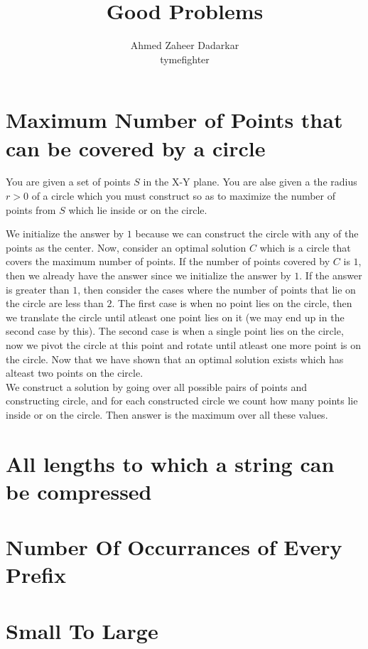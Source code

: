 \documentclass{article}
\title{Good Problems}
\author{
    Ahmed Zaheer Dadarkar\\
    tymefighter
}
\begin{document}
    \maketitle

    \section{Maximum Number of Points that can be covered by a circle}

    You are given a set of points $S$ in the X-Y plane. You are alse given
    a the radius $r > 0$ of a circle which you must construct so as to maximize
    the number of points from $S$ which lie inside or on the circle.

    We initialize the answer by $1$ because we can construct the circle with
    any of the points as the center. Now, consider an optimal solution $C$
    which is a circle that covers the maximum number of points. If the number
    of points covered by $C$ is $1$, then we already have the answer since we
    initialize the answer by $1$. If the answer is greater than $1$, then
    consider the cases where the number of points that lie on the circle are
    less than $2$. The first case is when no point lies on the circle,
    then we translate the circle until atleast one point lies on it (we may
    end up in the second case by this). The second case is when a single point
    lies on the circle, now we pivot the circle at this point and rotate until
    atleast one more point is on the circle. Now that we have shown that an
    optimal solution exists which has alteast two points on the circle. \\
    We construct a solution by going over all possible pairs of points and
    constructing circle, and for each constructed circle we count how many
    points lie inside or on the circle. Then answer is the maximum over all
    these values.

    \section{All lengths to which a string can be compressed}

    \section{Number Of Occurrances of Every Prefix}

    \section{Small To Large}
\end{document}
